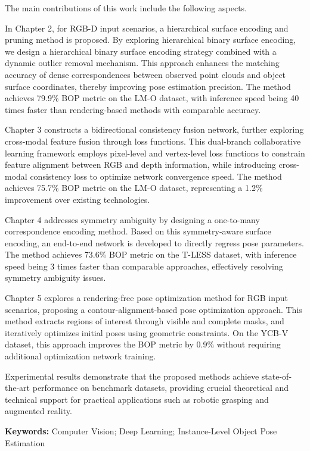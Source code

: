 \par The main contributions of this work include the following aspects. \par In Chapter 2, for RGB-D input scenarios, a hierarchical surface encoding and pruning method is proposed. By exploring hierarchical binary surface encoding, we design a hierarchical binary surface encoding strategy combined with a dynamic outlier removal mechanism. This approach enhances the matching accuracy of dense correspondences between observed point clouds and object surface coordinates, thereby improving pose estimation precision. The method achieves 79.9\% BOP metric on the LM-O dataset, with inference speed being 40 times faster than rendering-based methods with comparable accuracy. 
\par Chapter 3 constructs a bidirectional consistency fusion network, further exploring cross-modal feature fusion through loss functions. This dual-branch collaborative learning framework employs pixel-level and vertex-level loss functions to constrain feature alignment between RGB and depth information, while introducing cross-modal consistency loss to optimize network convergence speed. The method achieves 75.7\% BOP metric on the LM-O dataset, representing a 1.2\% improvement over existing technologies. 
\par Chapter 4 addresses symmetry ambiguity by designing a one-to-many correspondence encoding method. Based on this symmetry-aware surface encoding, an end-to-end network is developed to directly regress pose parameters. The method achieves 73.6\% BOP metric on the T-LESS dataset, with inference speed being 3 times faster than comparable approaches, effectively resolving symmetry ambiguity issues. 
\par Chapter 5 explores a rendering-free pose optimization method for RGB input scenarios, proposing a contour-alignment-based pose optimization approach. This method extracts regions of interest through visible and complete masks, and iteratively optimizes initial poses using geometric constraints. On the YCB-V dataset, this approach improves the BOP metric by 0.9\% without requiring additional optimization network training. 
\par Experimental results demonstrate that the proposed methods achieve state-of-the-art performance on benchmark datasets, providing crucial theoretical and technical support for practical applications such as robotic grasping and augmented reality.
\par \textbf{Keywords:} Computer Vision; Deep Learning; Instance-Level Object Pose Estimation